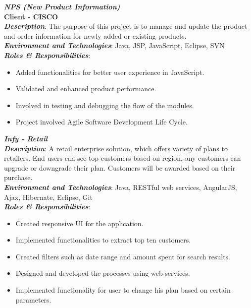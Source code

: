 \documentclass[margin, 10pt]{res} %
\begin{document}
\begin{resume}
{\sl \textbf{NPS (New Product Information)}} \hfill  \\
\textbf{Client - CISCO} \\
\textbf{\textit{Description}}: The purpose of this project is to manage and update the product and order information for newly added or existing products.     \\
\textbf{\textit{Environment and Technologies}}: Java, JSP, JavaScript, Eclipse, SVN \\
\textbf{\textit{Roles \& Responsibilities}}:  
\begin{itemize}
\item	Added functionalities for better user experience in JavaScript.  
\item	Validated and enhanced product performance.  
\item	Involved in testing and debugging the flow of the modules.   
\item	Project involved Agile Software Development Life Cycle.    
\end{itemize}  
{\sl \textbf{Infy - Retail }} \hfill  \\
\textbf{\textit{Description}}: A retail enterprise solution, which offers variety of plans to retailers. End users can see top customers based on region, any customers can upgrade or downgrade their plan.  Customers will be awarded based on their purchase.       \\
\textbf{\textit{Environment and Technologies}}: Java, RESTful web services, AngularJS, Ajax, Hibernate, Eclipse, Git      \\
\textbf{\textit{Roles \& Responsibilities}}: 
\begin{itemize}
\item	Created responsive UI for the application.  
\item	Implemented functionalities to extract top ten customers.  
\item	Created filters such as date range and amount spent for search results.  
\item	Designed and developed the processes using web-services.
\item	Implemented functionality for user to change his plan based on certain parameters.  

  
\end{itemize} 


\end{resume}
\end{document}
